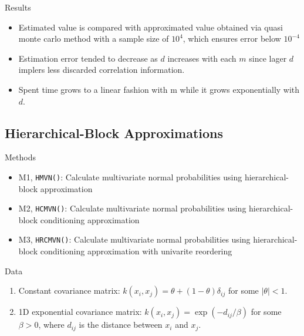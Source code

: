 \begin{frame}{\subsecname}

	\begin{block}{Results}
		\begin{itemize}
			\item Estimated value is compared with approximated value obtained via quasi monte carlo method with a sample size of $10^4$, which ensures error below $10^{-4}$
			\item Estimation error tended to decrease as $d$ increases with each $m$ since lager $d$ implers less discarded correlation information. 
			\item Spent time grows to a linear fashion with m while it grows exponentially with $d$.
		\end{itemize}
	\end{block}
	
\end{frame}

\subsection{Hierarchical-Block Approximations}

\begin{frame}{\subsecname}

	\begin{block}{Methods}
		\begin{itemize}
			\item M1, \texttt{HMVN()}: Calculate multivariate normal probabilities using hierarchical-block approximation
			\item M2, \texttt{HCMVN()}: Calculate multivariate normal probabilities using hierarchical-block conditioning approximation
			\item M3, \texttt{HRCMVN()}: Calculate multivariate normal probabilities using hierarchical-block conditioning approximation with univarite reordering
		\end{itemize}
	\end{block}

	\begin{block}{Data}
		\begin{enumerate}
			\item Constant covariance matrix: $k(x_i, x_j) = \theta + (1-\theta)\delta_{ij}$ for some $|\theta| < 1$.
			\item 1D exponential covariance matrix: $k(x_i, x_j) = \exp(-d_{ij}/\beta)$ for some $\beta > 0$, where $d_{ij}$ is the distance between $x_i$ and $x_j$.
		\end{enumerate}
	\end{block}

\end{frame}

